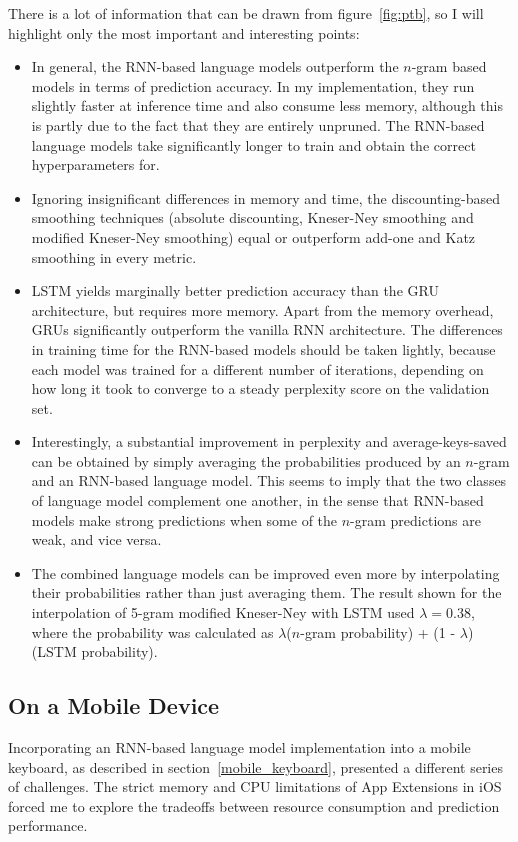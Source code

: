 \documentclass[a4paper, 12pt]{report}
\begin{document}
There is a lot of information that can be drawn from figure~\ref{fig:ptb}, so I will highlight only the most important and interesting points:
\begin{itemize}
\item
	In general, the RNN-based language models outperform the $n$-gram based models in terms of prediction accuracy. In my implementation, they run slightly faster at inference time and also consume less memory, although this is partly due to the fact that they are entirely unpruned. The RNN-based language models take significantly longer to train and obtain the correct hyperparameters for.
\item
	Ignoring insignificant differences in memory and time, the discounting-based smoothing techniques (absolute discounting, Kneser-Ney smoothing and modified Kneser-Ney smoothing) equal or outperform add-one and Katz smoothing in every metric.
\item
	LSTM yields marginally better prediction accuracy than the GRU architecture, but requires more memory. Apart from the memory overhead, GRUs significantly outperform the vanilla RNN architecture. The differences in training time for the RNN-based models should be taken lightly, because each model was trained for a different number of iterations, depending on how long it took to converge to a steady perplexity score on the validation set.
\item
	Interestingly, a substantial improvement in perplexity and average-keys-saved can be obtained by simply averaging the probabilities produced by an $n$-gram and an RNN-based language model. This seems to imply that the two classes of language model complement one another, in the sense that RNN-based models make strong predictions when some of the $n$-gram predictions are weak, and vice versa.
\item
	The combined language models can be improved even more by interpolating their probabilities rather than just averaging them. The result shown for the interpolation of 5-gram modified Kneser-Ney with LSTM used $\lambda = 0.38$, where the probability was calculated as $\lambda$($n$-gram probability) + (1 - $\lambda$)(LSTM probability).
\end{itemize}

\subsection{On a Mobile Device}

Incorporating an RNN-based language model implementation into a mobile keyboard, as described in section~\ref{mobile_keyboard}, presented a different series of challenges. The strict memory and CPU limitations of App Extensions in iOS forced me to explore the tradeoffs between resource consumption and prediction performance. \\
\end{document}
